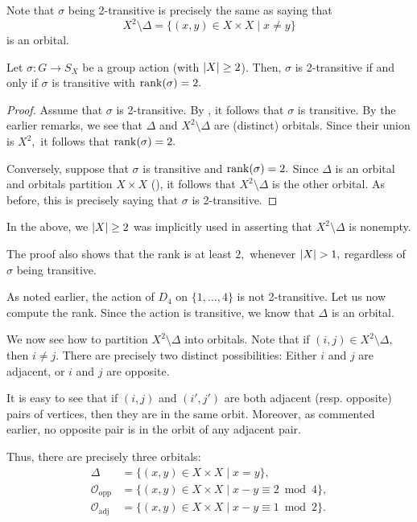 \begin{rem}
	Note that $\sigma$ being 2-transitive is precisely the same as saying that
	\begin{equation*} 
		X^2 \setminus \Delta = \{(x, y) \in X \times X \mid x \neq y\}
	\end{equation*}
	is an orbital.
\end{rem}

\begin{prop} \label{prop:2transiffrank2}
	Let $\sigma : G \to S_X$ be a group action (with ${\left\lvert X \right\lvert} \ge 2$). Then, $\sigma$ is 2-transitive if and only if $\sigma$ is transitive with $\operatorname{rank}(\sigma) = 2.$
\end{prop}

\begin{proof} 
	Assume that $\sigma$ is 2-transitive. By , it follows that $\sigma$ is transitive. By the earlier remarks, we see that $\Delta$ and $X^2 \setminus \Delta$ are (distinct) orbitals. Since their union is $X^2,$ it follows that $\operatorname{rank}(\sigma) = 2.$

	Conversely, suppose that $\sigma$ is transitive and $\operatorname{rank}(\sigma) = 2.$ Since $\Delta$ is an orbital and orbitals partition $X \times X$ (), it follows that $X^2 \setminus \Delta$ is the other orbital. As before, this is precisely saying that $\sigma$ is 2-transitive.
\end{proof}
	
In the above, we ${\left\lvert X \right\lvert} \ge 2$ was implicitly used in asserting that $X^2 \setminus \Delta$ is nonempty.

\begin{rem}
	The proof also shows that the rank is at least $2,$ whenever ${\left\lvert X \right\lvert} > 1,$ regardless of $\sigma$ being transitive.	
\end{rem}


\begin{ex}[Rank of $D_4$]
	As noted earlier, the action of $D_4$ on $\{1, \ldots, 4\}$ is not 2-transitive. Let us now compute the rank. Since the action is transitive, we know that $\Delta$ is an orbital.

	We now see how to partition $X^2 \setminus \Delta$ into orbitals. Note that if $(i, j) \in X^2 \setminus \Delta,$ then $i \neq j.$ There are precisely two distinct possibilities: Either $i$ and $j$ are adjacent, or $i$ and $j$ are opposite.

	It is easy to see that if $(i, j)$ and $(i', j')$ are both adjacent (resp. opposite) pairs of vertices, then they are in the same orbit. Moreover, as commented earlier, no opposite pair is in the orbit of any adjacent pair.

	Thus, there are precisely three orbitals:
	\begin{align*} 
		\Delta &= \{(x, y) \in X \times X \mid x = y\},\\
		\mathcal{O}_{\text{opp}} &= \{(x, y) \in X \times X \mid x - y \equiv 2 \bmod 4\},\\
		\mathcal{O}_{\text{adj}} &= \{(x, y) \in X \times X \mid x - y \equiv 1 \bmod 2\}.
	\end{align*}
\end{ex}

